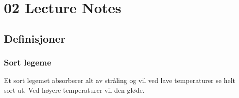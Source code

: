 \chapter{02 Lecture Notes}
\section{Definisjoner}
\subsection{Sort legeme}    
Et sort legemet absorberer alt av stråling og vil ved lave temperaturer se helt sort ut. Ved høyere temperaturer vil den gløde. 
